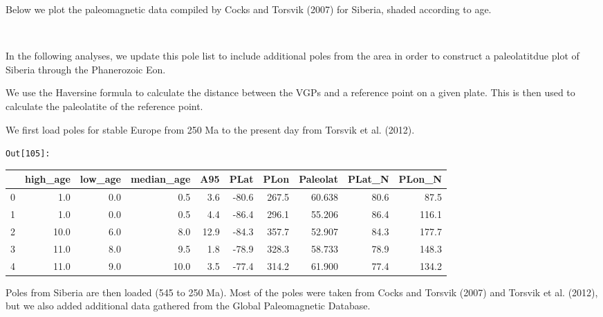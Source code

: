 \documentclass[11pt]{article}
\begin{document}
    Below we plot the paleomagnetic data compiled by Cocks and Torsvik
(2007) for Siberia, shaded according to age.


    \begin{center}
    \end{center}
    { \hspace*{\fill} \\}
    
    In the following analyses, we update this pole list to include
additional poles from the area in order to construct a paleolatitdue
plot of Siberia through the Phanerozoic Eon.

    We use the Haversine formula to calculate the distance between the VGPs
and a reference point on a given plate. This is then used to calculate
the paleolatite of the reference point.


    We first load poles for stable Europe from 250 Ma to the present day
from Torsvik et al. (2012).

\texttt{\color{outcolor}Out[{\color{outcolor}105}]:}
    
    {\tiny\begin{tabular}{lrrrrrrrrr}
\toprule
{} &  high\_age &  low\_age &  median\_age &   A95 &  PLat &   PLon &  Paleolat &  PLat\_N &  PLon\_N \\
\midrule
0 &       1.0 &      0.0 &         0.5 &   3.6 & -80.6 &  267.5 &    60.638 &    80.6 &    87.5 \\
1 &       1.0 &      0.0 &         0.5 &   4.4 & -86.4 &  296.1 &    55.206 &    86.4 &   116.1 \\
2 &      10.0 &      6.0 &         8.0 &  12.9 & -84.3 &  357.7 &    52.907 &    84.3 &   177.7 \\
3 &      11.0 &      8.0 &         9.5 &   1.8 & -78.9 &  328.3 &    58.733 &    78.9 &   148.3 \\
4 &      11.0 &      9.0 &        10.0 &   3.5 & -77.4 &  314.2 &    61.900 &    77.4 &   134.2 \\
\bottomrule
\end{tabular}}

    

    Poles from Siberia are then loaded (545 to 250 Ma). Most of the poles
were taken from Cocks and Torsvik (2007) and Torsvik et al. (2012), but
we also added additional data gathered from the Global Paleomagnetic
Database.
\end{document}
